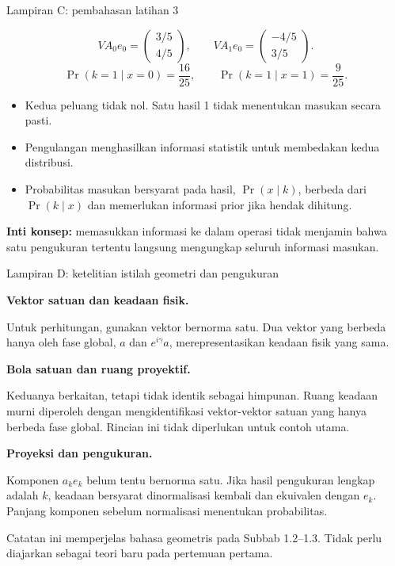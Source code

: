\documentclass[aspectratio=169,11pt]{beamer}
\begin{document}
\begin{frame}{Lampiran C: pembahasan latihan 3}

\[
 VA_0e_0=\begin{pmatrix}3/5\\4/5\end{pmatrix},\qquad
 VA_1e_0=\begin{pmatrix}-4/5\\3/5\end{pmatrix}.
\]
\[
 \Pr(k=1\mid x=0)=\frac{16}{25},\qquad
 \Pr(k=1\mid x=1)=\frac9{25}.
\]
\begin{itemize}
\item Kedua peluang tidak nol. Satu hasil 1 tidak menentukan masukan secara pasti.
\item Pengulangan menghasilkan informasi statistik untuk membedakan kedua distribusi.
\item Probabilitas masukan bersyarat pada hasil, $\Pr(x\mid k)$, berbeda dari $\Pr(k\mid x)$ dan memerlukan informasi prior jika hendak dihitung.
\end{itemize}
\textbf{Inti konsep:} memasukkan informasi ke dalam operasi tidak menjamin bahwa satu pengukuran tertentu langsung mengungkap seluruh informasi masukan.

\end{frame}

\begin{frame}{Lampiran D: ketelitian istilah geometri dan pengukuran}

\textbf{Vektor satuan dan keadaan fisik.}\par
Untuk perhitungan, gunakan vektor bernorma satu. Dua vektor yang berbeda hanya oleh fase global, $a$ dan $e^{i\gamma}a$, merepresentasikan keadaan fisik yang sama.
\par\medskip
\textbf{Bola satuan dan ruang proyektif.}\par
Keduanya berkaitan, tetapi tidak identik sebagai himpunan. Ruang keadaan murni diperoleh dengan mengidentifikasi vektor-vektor satuan yang hanya berbeda fase global. Rincian ini tidak diperlukan untuk contoh utama.
\par\medskip
\textbf{Proyeksi dan pengukuran.}\par
Komponen $a_ke_k$ belum tentu bernorma satu. Jika hasil pengukuran lengkap adalah $k$, keadaan bersyarat dinormalisasi kembali dan ekuivalen dengan $e_k$. Panjang komponen sebelum normalisasi menentukan probabilitas.
\par\medskip
\small Catatan ini memperjelas bahasa geometris pada Subbab 1.2--1.3. Tidak perlu diajarkan sebagai teori baru pada pertemuan pertama.

\end{frame}
\end{document}
